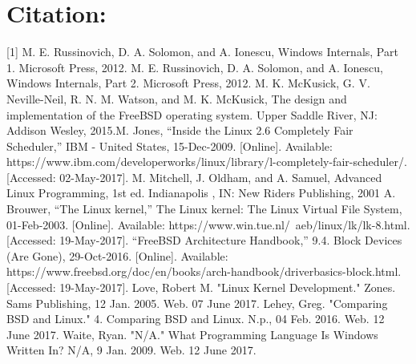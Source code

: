 \documentclass{article}
\begin{document}
\part{Citation:}
[1] M. E. Russinovich, D. A. Solomon, and A. Ionescu, Windows Internals, Part 1. Microsoft Press, 2012. \newline \newline
[2] M. E. Russinovich, D. A. Solomon, and A. Ionescu, Windows Internals, Part 2. Microsoft Press, 2012. \newline \newline
[3] M. K. McKusick, G. V. Neville-Neil, R. N. M. Watson, and M. K. McKusick, The design and implementation of the FreeBSD operating system. Upper Saddle River, NJ: Addison Wesley, 2015.\newline \newline
[4] M. Jones, “Inside the Linux 2.6 Completely Fair Scheduler,” IBM - United States, 15-Dec-2009. [Online]. Available: https://www.ibm.com/developerworks/linux/library/l-completely-fair-scheduler/. [Accessed: 02-May-2017]. \newline \newline
[5] M. Mitchell, J. Oldham, and A. Samuel, Advanced Linux Programming, 1st ed. Indianapolis , IN: New Riders Publishing, 2001 \newline \newline
[6] A. Brouwer, “The Linux kernel,” The Linux kernel: The Linux Virtual File System, 01-Feb-2003. [Online]. Available: https://www.win.tue.nl/~aeb/linux/lk/lk-8.html. [Accessed: 19-May-2017]. \newline \newline
[7]“FreeBSD Architecture Handbook,” 9.4. Block Devices (Are Gone), 29-Oct-2016. [Online]. Available: https://www.freebsd.org/doc/en/books/arch-handbook/driverbasics-block.html. [Accessed: 19-May-2017]. \newline \newline
[8] Love, Robert M. "Linux Kernel Development." Zones. Sams Publishing, 12 Jan. 2005. Web. 07 June 2017. \newline\newline
[9] Lehey, Greg. "Comparing BSD and Linux." 4. Comparing BSD and Linux. N.p., 04 Feb. 2016. Web. 12 June 2017. \newline \newline
[10] Waite, Ryan. "N/A." What Programming Language Is Windows Written In? N/A, 9 Jan. 2009. Web. 12 June 2017. \newline \newline
\end{document}
